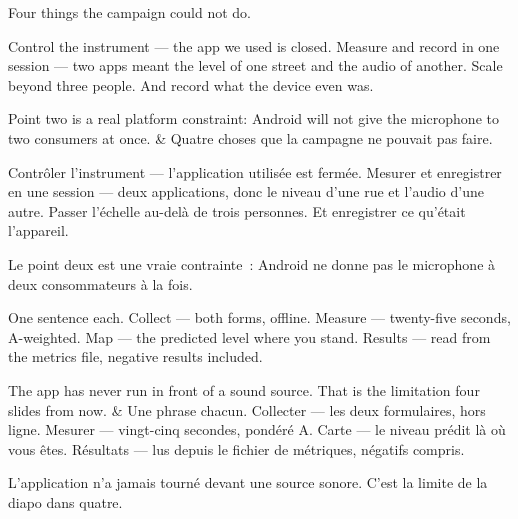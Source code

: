 \documentclass[10pt,a4paper]{article}
\begin{document}
\begin{say}
Four things the campaign could not do.

Control the instrument --- the app we used is closed. Measure and record in one
session --- two apps meant the level of one street and the audio of another. Scale
beyond three people. And record what the device even was.

Point two is a real platform constraint: Android will not give the microphone to
two consumers at once.
&
Quatre choses que la campagne ne pouvait pas faire.

Contrôler l'instrument --- l'application utilisée est fermée. Mesurer et
enregistrer en une session --- deux applications, donc le niveau d'une rue et
l'audio d'une autre. Passer l'échelle au-delà de trois personnes. Et enregistrer
ce qu'était l'appareil.

Le point deux est une vraie contrainte~: Android ne donne pas le microphone à deux
consommateurs à la fois.
\end{say}

\begin{say}
One sentence each. Collect --- both forms, offline. Measure --- twenty-five
seconds, A-weighted. Map --- the predicted level where you stand. Results --- read
from the metrics file, negative results included.

 The app has never run in front of a sound source. That is the
limitation four slides from now.
&
Une phrase chacun. Collecter --- les deux formulaires, hors ligne. Mesurer ---
vingt-cinq secondes, pondéré A. Carte --- le niveau prédit là où vous êtes.
Résultats --- lus depuis le fichier de métriques, négatifs compris.

 L'application n'a jamais tourné devant une source sonore. C'est la
limite de la diapo dans quatre.
\end{say}
\end{document}

